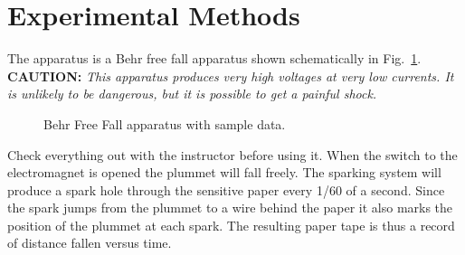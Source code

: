 
\section*{Experimental Methods}
     The apparatus is a Behr free fall apparatus shown
schematically in Fig.~\ref{fig:behr}.  {\bf CAUTION:} {\em This apparatus
produces very high voltages at very low currents.  It is unlikely to
be dangerous, but it is possible to get a painful shock.}
\begin{figure}[hbt]
\begin{center}
{}
\end{center}
 \caption{Behr Free Fall apparatus with sample data.  \label{fig:behr}}
\end{figure}
Check everything out with the instructor before using it.  When the switch to
the electromagnet is opened the plummet will fall freely.  The sparking system
will produce a spark hole through the sensitive paper every 1/60 of a second.
Since the spark jumps from the plummet to a wire behind the paper it also marks
the position of the plummet at each spark.  The resulting paper tape is thus a
 record of distance fallen versus time.

